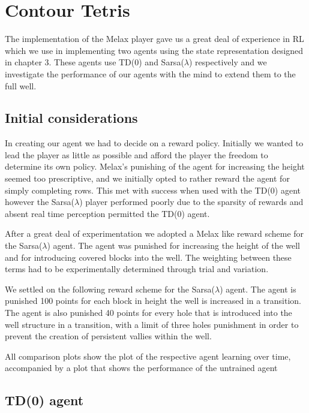 \documentclass{rucsthesis}
\begin{document}
\chapter{Contour Tetris}

The implementation of the Melax player gave us a great deal of experience in RL which we use in implementing two agents using the state representation designed in chapter 3.  These agents use TD(0) and Sarsa($\lambda$) respectively and we investigate the performance of our agents with the mind to extend them to the full well.

\section{Initial considerations}

In creating our agent we had to decide on a reward policy. Initially we wanted to lead the player as little as possible and afford the player the freedom to determine its own policy. Melax's punishing of the agent for increasing the height seemed too prescriptive, and we initially opted to rather reward the agent for simply completing rows. This met with success when used with the TD(0) agent however the Sarsa($\lambda$) player performed poorly due to the sparsity of rewards and absent real time perception permitted the TD(0) agent.

After a great deal of experimentation we adopted a  Melax like reward scheme for the Sarsa($\lambda$) agent. The agent was punished for increasing the height of the well and for introducing covered blocks into the well. The weighting between these terms had to be experimentally determined through trial and variation.

We settled on the following reward scheme for the Sarsa($\lambda$) agent. The agent is punished 100 points for each block in height the well is increased in a transition. The agent is also punished 40 points for every hole that is introduced into the well structure in a transition, with a limit of three holes punishment in order to prevent the creation of persistent vallies within the well.

All comparison plots show the plot of the respective agent learning over time, accompanied by a plot that shows the performance of the untrained agent

\section{TD(0) agent}
\end{document}
